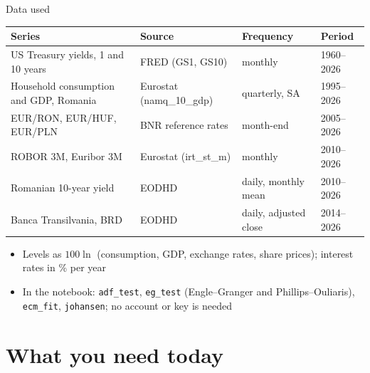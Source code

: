 \begin{frame}{Data used}
\itemsize{\small}
\begin{center}
\footnotesize
\begin{tabular}{llll}
\toprule
\textbf{Series} & \textbf{Source} & \textbf{Frequency} & \textbf{Period} \\
\midrule
US Treasury yields, 1 and 10 years & FRED (GS1, GS10) & monthly & 1960--2026 \\
Household consumption and GDP, Romania & Eurostat (namq\_10\_gdp) & quarterly, SA & 1995--2026 \\
EUR/RON, EUR/HUF, EUR/PLN & BNR reference rates & month-end & 2005--2026 \\
ROBOR 3M, Euribor 3M & Eurostat (irt\_st\_m) & monthly & 2010--2026 \\
Romanian 10-year yield & EODHD & daily, monthly mean & 2010--2026 \\
Banca Transilvania, BRD & EODHD & daily, adjusted close & 2014--2026 \\
\bottomrule
\end{tabular}
\end{center}
\begin{itemize}
    \item Levels as $100\ln$ (consumption, GDP, exchange rates, share prices); interest rates in \% per year
    \item In the notebook: \texttt{adf\_test}, \texttt{eg\_test} (Engle--Granger and Phillips--Ouliaris), \texttt{ecm\_fit}, \texttt{johansen}; no account or key is needed
\end{itemize}
\end{frame}


\section{What you need today}

